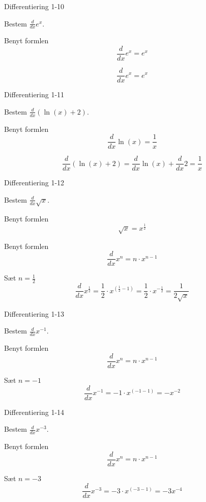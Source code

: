 \documentclass{article}
\begin{document}
\begin{exercise}{Differentiering 1-10}

Bestem $\frac{d}{dx} e^x$.


\hint

Benyt formlen
\[
\frac{d}{dx} e^x = e^x
\]

\hint

\[
\frac{d}{dx} e^x = e^x
\]
\end{exercise}

\begin{exercise}{Differentiering 1-11}

Bestem $\frac{d}{dx}\left( \ln(x) + 2 \right)$.


\hint

Benyt formlen
\[
\frac{d}{dx} \ln(x) = \frac{1}{x}
\]

\hint

\[
\frac{d}{dx} \left( \ln(x) + 2 \right) = \frac{d}{dx} \ln(x) + \frac{d}{dx} 2 = \frac{1}{x}
\]
\end{exercise}

\begin{exercise}{Differentiering 1-12}

Bestem $\frac{d}{dx} \sqrt{x}$.


\hint
Benyt formlen
\[
\sqrt{x} = x^{\frac{1}{2}}
\]

\hint
Benyt formlen
\[
\frac{d}{dx} x^n = n \cdot x^{n - 1}
\]

\hint

Sæt $n = \frac{1}{2}$
\[
\frac{d}{dx} x^{\frac{1}{2}} = \frac{1}{2} \cdot x^{\left(\frac{1}{2} - 1\right)} = \frac{1}{2} \cdot x^{ - \frac{1}{2}} = \frac{1}{2 \sqrt{x}}
\]
\end{exercise}

\begin{exercise}{Differentiering 1-13}

Bestem $\frac{d}{dx} x^{-1}$.


\hint

Benyt formlen
\[
\frac{d}{dx} x^n = n \cdot x^{n - 1}
\]

\hint

Sæt $n = -1$
\[
\frac{d}{dx} x^{-1} = -1 \cdot x^{\left(-1 - 1\right)} = - x^{-2}
\]
\end{exercise}

\begin{exercise}{Differentiering 1-14}

Bestem $\frac{d}{dx} x^{-3}$.


\hint

Benyt formlen
\[
\frac{d}{dx} x^n = n \cdot x^{n - 1}
\]

\hint

Sæt $n = -3$
\[
\frac{d}{dx} x^{-3} = -3 \cdot x^{\left(-3 - 1 \right)} = -3 x^{-4}
\]
\end{exercise}
\end{document}
